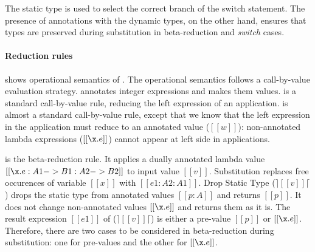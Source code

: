 
The static type is used to select the correct branch of the switch statement.
The presence of annotations with the dynamic types, on the other hand,
ensures that types are preserved during substitution in
beta-reduction and \emph{switch} cases.

\paragraph{Reduction rules}
 shows operational semantics of \cal.
The operational semantics follows a call-by-value evaluation strategy.
 annotates integer expressions and makes them
values.  is a standard call-by-value rule, reducing
the left expression of an application.
 is almost a standard call-by-value rule, except
that we know that the left expression in the application must reduce
to an annotated value ($[[w]]$): non-annotated lambda expressions
($[[\x.e]]$) cannot appear at left side in applications.

 is the beta-reduction rule. It applies a dually
annotated lambda value $[[\x.e : A1 -> B1 : A2 -> B2]]$ to input
value $[[v]]$. Substitution replaces free occurences of variable
$[[x]]$ with $[[e1:A2:A1]]$.
Drop Static Type ($\rceil[[v]]\lceil$) drops the static type
from annotated values $[[p:A]]$ and returns $[[p]]$.
It does not change non-annotated values $[[\x.e]]$ and returns 
them as it is. The result expression $[[e1]]$ of ($\rceil[[v]]\lceil$)
is either a pre-value $[[p]]$ or $[[\x.e]]$.
Therefore, there are two cases to be considered in beta-reduction
during substitution: one for pre-values and the other for $[[\x.e]]$.

